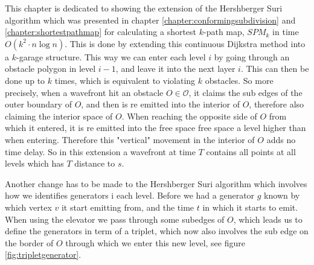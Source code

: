 \label{chapter:shortestpathobstaclesviolation}

This chapter is dedicated to showing the extension of the Hershberger Suri algorithm which was presented in chapter 
\ref{chapter:conformingsubdivision} and \ref{chapter:shortestpathmap} for calculating a shortest $k$-path map, $SPM_k$ in time $O(k^2 \cdot 
n \log n)$. This is done by extending this continuous Dijkstra method into a $k$-garage structure. This way we can enter each level $i$ by 
going through an obstacle polygon in level $i-1$, and leave it into the next layer $i$. This can then be done up to $k$ times, which is 
equivalent to violating $k$ obstacles. So more precisely, when a wavefront hit an obstacle $O \in \mathcal{O}$, it claims the sub edges of 
the outer boundary of $O$, and then is re emitted into the interior of $O$, therefore also claiming the interior space of $O$. When reaching
the opposite side of $O$ from which it entered, it is re emitted into the free space free space a level higher than when entering. Therefore
this "vertical" movement in the interior of $O$ adds no time delay. So in this extension a wavefront at time $T$ contains all points at all 
levels which has $T$ distance to $s$. 

Another change has to be made to the Hershberger Suri algorithm which involves how we identifies generators i each level. Before we had a 
generator $g$ known by which vertex $v$ it start emitting from, and the time $t$ in which it starts to emit. When using the elevator we pass
through some subedges of $O$, which leads us to define the generators in term of a triplet, which now also involves the sub edge on the 
border of $O$ through which we enter this new level, see figure \ref{fig:tripletgenerator}.

